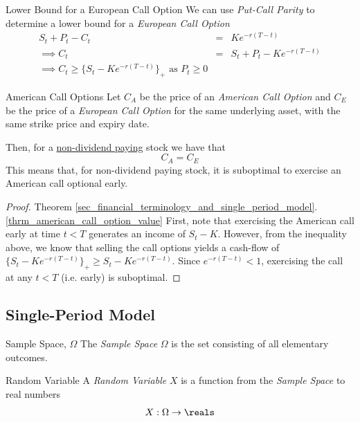 \documentclass[11pt,a4paper]{article}
\begin{document}
  \begin{theorem}{Lower Bound for a European Call Option}
    We can use \textit{Put-Call Parity} to determine a lower bound for a \textit{European Call Option}
    \[\begin{array}{rcl}
      S_t+P_t-C_t&=&Ke^{-r(T-t)}\\
      \implies C_t&=&S_t+P_t-Ke^{-r(T-t)}\\
      \implies C_t\geq\{S_t-Ke^{-r(T-t)}\}_+\text{ as }P_t\geq0
    \end{array}\]
  \end{theorem}

  \begin{theorem}{American Call Options}\label{thrm_american_call_option_value}
    Let $C_A$ be the price of an \textit{American Call Option} and $C_E$ be the price of a \textit{European Call Option} for the same underlying asset, with the same strike price and expiry date.
    \par Then, for a \underline{non-dividend paying} stock we have that
    \[ C_A=C_E \]
    This means that, for non-dividend paying stock, it is suboptimal to exercise an American call optional early.
  \end{theorem}

  \begin{proof}{Theorem \ref{sec_financial_terminology_and_single_period_model}.\ref{thrm_american_call_option_value}}
    First, note that exercising the American call early at time $t<T$ generates an income of $S_t-K$. However, from the inequality above, we know that selling the call options yields a cash-flow of $\{S_t-Ke^{-r(T-t)}\}_+\geq S_t-Ke^{-r(T-t)}$. Since $e^{-r(T-t)}<1$, exercising the call at any $t<T$ (i.e. early) is suboptimal.
  \end{proof}

\subsection{Single-Period Model}

  \begin{definition}{Sample Space, $\Omega$}
    The \textit{Sample Space} $\Omega$ is the set consisting of all elementary outcomes.
  \end{definition}

  \begin{definition}{Random Variable}
    A \textit{Random Variable} $X$ is a function from the \textit{Sample Space} to real numbers
    \[ X:\Omega\to\reals \]
  \end{definition}
\end{document}

